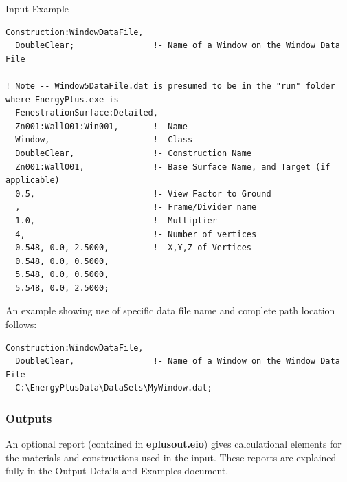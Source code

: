 Input Example

\begin{lstlisting}
Construction:WindowDataFile,
  DoubleClear;                !- Name of a Window on the Window Data File

! Note -- Window5DataFile.dat is presumed to be in the "run" folder where EnergyPlus.exe is
  FenestrationSurface:Detailed,
  Zn001:Wall001:Win001,       !- Name
  Window,                     !- Class
  DoubleClear,                !- Construction Name
  Zn001:Wall001,              !- Base Surface Name, and Target (if applicable)
  0.5,                        !- View Factor to Ground
  ,                           !- Frame/Divider name
  1.0,                        !- Multiplier
  4,                          !- Number of vertices
  0.548, 0.0, 2.5000,         !- X,Y,Z of Vertices
  0.548, 0.0, 0.5000,
  5.548, 0.0, 0.5000,
  5.548, 0.0, 2.5000;
\end{lstlisting}

An example showing use of specific data file name and complete path location follows:

\begin{lstlisting}
Construction:WindowDataFile,
  DoubleClear,                !- Name of a Window on the Window Data File
  C:\EnergyPlusData\DataSets\MyWindow.dat;
\end{lstlisting}

\subsubsection{Outputs}\label{outputs-4-016}

An optional report (contained in \textbf{eplusout.eio}) gives calculational elements for the materials and constructions used in the input. These reports are explained fully in the Output Details and Examples document.
